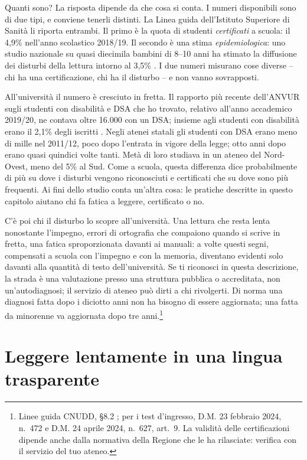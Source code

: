 Quanti sono? La risposta dipende da che cosa si conta. I numeri disponibili sono di due tipi, e conviene tenerli distinti. La Linea guida dell'Istituto Superiore di Sanità li riporta entrambi. Il primo è la
quota di studenti \emph{certificati} a scuola: il 4,9\% nell'anno
scolastico 2018/19. Il secondo è una stima \emph{epidemiologica}: uno
studio nazionale su quasi diecimila bambini di 8--10 anni ha stimato
la diffusione dei disturbi della lettura intorno al 3,5\%
\parencite{iss2022}. I due numeri misurano cose diverse -- chi ha una
certificazione, chi ha il disturbo -- e non vanno sovrapposti.

All'università il numero è cresciuto in fretta. Il rapporto più recente dell'ANVUR sugli studenti con disabilità e DSA che ho trovato, relativo all'anno accademico 2019/20, ne contava oltre 16.000 con un DSA; insieme agli
studenti con disabilità erano il 2,1\% degli iscritti
\parencite{anvur2022dsa}. Negli atenei statali gli studenti con DSA
erano meno di mille nel 2011/12, poco dopo l'entrata in vigore della legge; otto anni dopo erano quasi quindici volte tanti. Metà
di loro studiava in un ateneo del Nord-Ovest, meno del 5\% al Sud.
Come a scuola, questa differenza dice probabilmente di più su dove i
disturbi vengono riconosciuti e certificati che su dove sono più
frequenti. Ai fini dello studio conta un'altra cosa: le pratiche descritte in questo capitolo aiutano
chi fa fatica a leggere, certificato o no.

C'è poi chi il disturbo lo scopre all'università. Una lettura che
resta lenta nonostante l'impegno, errori di ortografia che compaiono
quando si scrive in fretta, una fatica sproporzionata davanti ai
manuali: a volte questi segni, compensati a scuola con l'impegno e con
la memoria, diventano evidenti solo davanti alla quantità di testo
dell'università. Se ti riconosci in questa descrizione, la strada è una valutazione presso una struttura pubblica o accreditata, non un'autodiagnosi; il servizio di ateneo può dirti a chi rivolgerti. Di norma una diagnosi fatta dopo i diciotto anni non ha bisogno di essere aggiornata; una fatta da minorenne va aggiornata dopo tre anni.\footnote{Linee guida CNUDD, §8.2
\parencite{cnudd2024}; per i test d'ingresso, D.M. 23 febbraio 2024,
n.~472 e D.M. 24 aprile 2024, n.~627, art.~9. La validità delle
certificazioni dipende anche dalla normativa della Regione che le ha
rilasciate: verifica con il servizio del tuo ateneo.}

\section{Leggere lentamente in una lingua trasparente}


